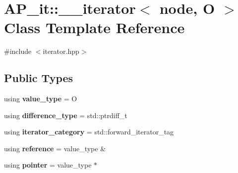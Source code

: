 \hypertarget{classAP__it_1_1____iterator}{}\section{A\+P\+\_\+it\+:\+:\+\_\+\+\_\+iterator$<$ node, O $>$ Class Template Reference}
\label{classAP__it_1_1____iterator}


{\ttfamily \#include $<$iterator.\+hpp$>$}

\subsection*{Public Types}
\begin{DoxyCompactItemize}
\item 
\mbox{\label{classAP__it_1_1____iterator_a75d953d4a4b92a7812715bcfc0836c9c}} 
using {\bfseries value\+\_\+type} = O
\item 
\mbox{\label{classAP__it_1_1____iterator_a24fab44b4ad74c525f384feeb2aa293a}} 
using {\bfseries difference\+\_\+type} = std\+::ptrdiff\+\_\+t
\item 
\mbox{\label{classAP__it_1_1____iterator_affe71c2d2921afc842c1376fee3d4938}} 
using {\bfseries iterator\+\_\+category} = std\+::forward\+\_\+iterator\+\_\+tag
\item 
\mbox{\label{classAP__it_1_1____iterator_a1f3171a408f89aef2cd4867c33f73136}} 
using {\bfseries reference} = value\+\_\+type \&
\item 
\mbox{\label{classAP__it_1_1____iterator_accace5c026fd451cedd52ae6cb8020c9}} 
using {\bfseries pointer} = value\+\_\+type $\ast$
\end{DoxyCompactItemize}
